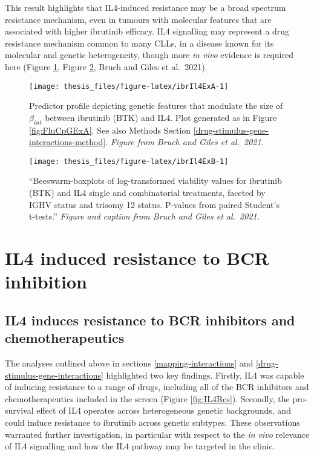 \documentclass[11pt, a4paper, twosided]{book}
\begin{document}
This result highlights that IL4-induced resistance may be a broad spectrum resistance mechanism, even in tumours with molecular features that are associated with higher ibrutinib efficacy. IL4 signalling may represent a drug resistance mechanism common to many CLLs, in a disease known for its molecular and genetic heterogeneity, though more \emph{in vivo} evidence is required here (Figure \ref{fig:ibrIl4ExA}, Figure \ref{fig:ibrIl4ExB}, Bruch and Giles et al.~2021).




\begin{figure}

{\centering \texttt{[image: thesis\_files/figure-latex/ibrIl4ExA-1]} 

}

\caption{Predictor profile depicting genetic features that modulate the size of \(\beta_{int}\) between ibrutinib (BTK) and IL4. Plot generated as in Figure \ref{fig:FluCpGExA}. See also Methods Section \ref{drug-stimulus-gene-interactions-method}. \emph{Figure from Bruch and Giles et al.~2021.}}\label{fig:ibrIl4ExA}
\end{figure}
\begin{figure}

{\centering \texttt{[image: thesis\_files/figure-latex/ibrIl4ExB-1]} 

}

\caption{``Beeswarm-boxplots of log-transformed viability values for ibrutinib (BTK) and IL4 single and combinatorial treatments, faceted by IGHV status and trisomy 12 status. P-values from paired Student's t-tests.'' \emph{Figure and caption from Bruch and Giles et al.~2021.}}\label{fig:ibrIl4ExB}
\end{figure}
\hypertarget{il4-ibrutinib}{%
\section{IL4 induced resistance to BCR inhibition}\label{il4-ibrutinib}}

\hypertarget{IL4resistance}{%
\subsection{IL4 induces resistance to BCR inhibitors and chemotherapeutics}\label{IL4resistance}}

The analyses outlined above in sections \ref{mapping-interactions} and \ref{drug-stimulus-gene-interactions} highlighted two key findings. Firstly, IL4 was capable of inducing resistance to a range of drugs, including all of the BCR inhibitors and chemotherapeutics included in the screen (Figure \ref{fig:IL4Res}). Secondly, the pro-survival effect of IL4 operates across heterogeneous genetic backgrounds, and could induce resistance to ibrutinib across genetic subtypes. These observations warranted further investigation, in particular with respect to the \emph{in vivo} relevance of IL4 signalling and how the IL4 pathway may be targeted in the clinic.
\end{document}
